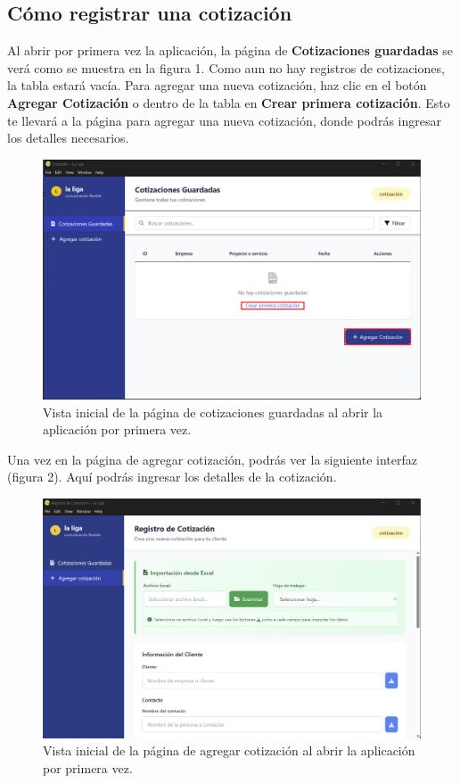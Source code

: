 \documentclass{Pretexto/bluereport}
\begin{document}
\subsection{Cómo registrar una cotización}
Al abrir por primera vez la aplicación, la página de \textbf{Cotizaciones guardadas} se verá como se muestra en la figura 1.
Como aun no hay registros de cotizaciones, la tabla estará vacía. Para agregar una nueva cotización, haz clic en el botón \textbf{Agregar Cotización} o dentro de
la tabla en \textbf{Crear primera cotización}. Esto te llevará a la página para agregar una nueva cotización, donde podrás ingresar los detalles necesarios.
\begin{figure}[H]
    \centering
        \includegraphics[width=0.85\linewidth]{img/abrir_primera_vez.png}
    \caption{Vista inicial de la página de cotizaciones guardadas al abrir la aplicación por primera vez.}
    \label{fig:vista_inicial}
\end{figure}
Una vez en la página de agregar cotización, podrás ver la siguiente interfaz (figura 2). Aquí podrás ingresar los detalles de la cotización.
\begin{figure}[H] 
    \centering
        \includegraphics[width=0.85\linewidth]{img/add_cotizacion_inicial.png}
    \caption{Vista inicial de la página de agregar cotización al abrir la aplicación por primera vez.}
    \label{fig:vista_inicial_add}
\end{figure}
\end{document}
